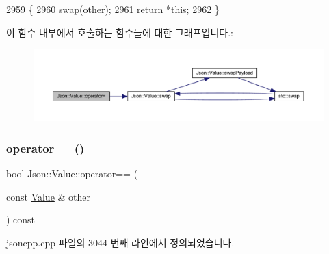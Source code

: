 \begin{DoxyCode}
2959                                    \{
2960   \hyperlink{class_json_1_1_value_aab841120d78e296e1bc06a373345e822}{swap}(other);
2961   \textcolor{keywordflow}{return} *\textcolor{keyword}{this};
2962 \}
\end{DoxyCode}
이 함수 내부에서 호출하는 함수들에 대한 그래프입니다.\+:\nopagebreak
\begin{figure}[H]
\begin{center}
\leavevmode
\includegraphics[width=350pt]{class_json_1_1_value_a795acb28772da4c5d85ae8f4af36c69f_cgraph}
\end{center}
\end{figure}
\mbox{\label{class_json_1_1_value_a16f9250e30d5c4505cd11137c564a764}} 
\subsubsection{\texorpdfstring{operator==()}{operator==()}}
{\footnotesize\ttfamily bool Json\+::\+Value\+::operator== (\begin{DoxyParamCaption}\item[{const \hyperlink{class_json_1_1_value}{Value} \&}]{other }\end{DoxyParamCaption}) const}



jsoncpp.\+cpp 파일의 3044 번째 라인에서 정의되었습니다.


